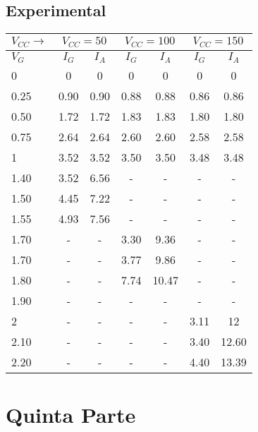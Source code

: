 \subsection{Experimental}
\begin{table}[H]
  \begin{center}
    \begin{tabular}{|l|c|c|c|c|c|c|}
      \hline
      $V_{CC}\rightarrow$ &\multicolumn{2}{|c|}{$V_{CC}=50$} &\multicolumn{2}{c|}{$V_{CC}=100$} &\multicolumn{2}{c|}{$V_{CC}=150$} \\ 
      \hline
      \hline
      $V_{G}$ &$I_G$ &$I_A$ &$I_G$ &$I_A$  &$I_G$ &$I_A$ \\ 
      \hline
      0     &0     &0    &0    &0     &0     &0      \\
      0.25  &0.90  &0.90 &0.88 &0.88  &0.86  &0.86   \\
      0.50  &1.72  &1.72 &1.83 &1.83  &1.80  &1.80   \\
      0.75  &2.64  &2.64 &2.60 &2.60  &2.58  &2.58   \\
      1     &3.52  &3.52 &3.50 &3.50  &3.48  &3.48   \\
      1.40  &3.52  &6.56 &-    &-     &-     &-      \\
      1.50  &4.45  &7.22 &-    &-     &-     &-      \\
      1.55  &4.93  &7.56 &-    &-     &-     &-      \\
      1.70  &-     &-    &3.30 &9.36  &-     &-      \\
      1.70  &-     &-    &3.77 &9.86  &-     &-      \\
      1.80  &-     &-    &7.74 &10.47 &-     &-      \\
      1.90  &-     &-    &-    &-     &-     &-      \\
      2     &-     &-    &-    &-     &3.11  &12     \\
      2.10  &-     &-    &-    &-     &3.40  &12.60  \\
      2.20  &-     &-    &-    &-     &4.40  &13.39  \\
      \hline
    \end{tabular}
  \end{center}
\end{table}





\section{Quinta Parte}
